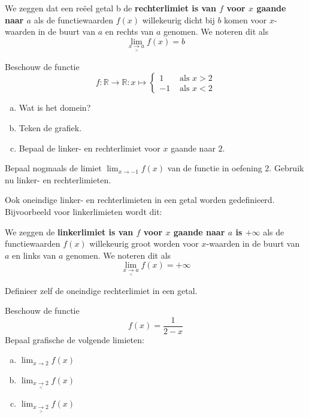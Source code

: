 \documentclass[12pt,twoside,a4paper]{article}
\newenvironment{definitie}
{
  \vspace{0.4cm}
  \begin{mdframed}[nobreak=true,frametitle={Definitie}]
  }{%
  \end{mdframed}
}
\begin{document}
\begin{definitie}
  We zeggen dat een reëel getal b de {\bf rechterlimiet is van $f$ voor $x$ gaande naar $a$} als de functiewaarden $f(x)$ willekeurig dicht bij $b$ komen voor $x$-waarden in de buurt van $a$ en rechts van $a$ genomen. We noteren dit als
  $$\lim_{x\underset{>}{\to}a}f(x)=b$$
\end{definitie}

\begin{oefening}
  Beschouw de functie
  $$f:\mathbb{R}\to\mathbb{R}:x\mapsto\begin{cases}
    1 & \mbox{ als } x > 2\\
    -1& \mbox{ als } x < 2
  \end{cases}
  $$
  \begin{enumerate}[(a)]
  \item Wat is het domein?
  \item Teken de grafiek.
  \item Bepaal de linker- en rechterlimiet voor $x$ gaande naar $2$.
  \end{enumerate}
\end{oefening}

\begin{oefening}
  Bepaal nogmaals de limiet $\displaystyle\lim_{x\to-1} f(x)$ van de functie in oefening 2. Gebruik nu linker- en rechterlimieten.
\end{oefening}

Ook oneindige linker- en rechterlimieten in een getal worden gedefinieerd. Bijvoorbeeld voor linkerlimieten wordt dit:

\begin{definitie}
  We zeggen de {\bf linkerlimiet is van $f$ voor $x$ gaande naar $a$ is $+\infty$} als de functiewaarden $f(x)$ willekeurig groot worden voor $x$-waarden in de buurt van $a$ en links van $a$ genomen. We noteren dit als
  $$\lim_{x\underset{<}{\to}a}f(x)=+\infty$$
\end{definitie}

\begin{oefening}
  Definieer zelf de oneindige rechterlimiet in een getal.
\end{oefening}

\begin{oefening}
Beschouw de functie
$$f(x)=\dfrac{1}{2-x}$$
Bepaal grafische de volgende limieten:
\begin{enumerate}[(a)]
  \itemsep.5em
  \item $\displaystyle\lim_{x\to 2} f(x)$
  \item $\displaystyle\lim_{x\underset{<}{\to} 2} f(x)$
  \item $\displaystyle\lim_{x\underset{>}{\to} 2} f(x)$
\end{enumerate}
\end{oefening}
\end{document}
